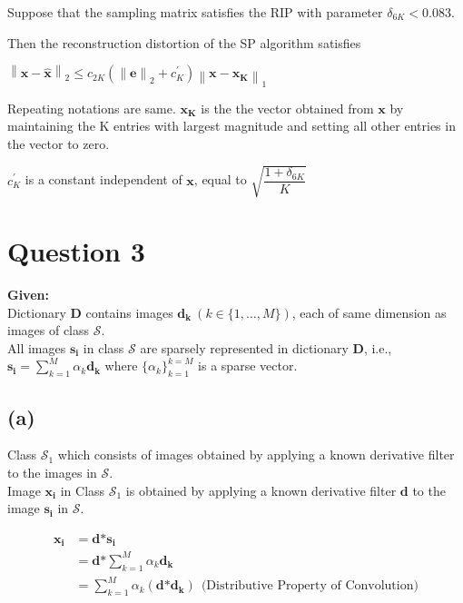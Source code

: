 \documentclass[fleqn, 11pt]{article}
\newcommand{\bs}[1]{\boldsymbol{#1}}
\newcommand\norm[1]{\left\lVert#1\right\rVert}
\begin{document}
\smallskip

Suppose that the sampling matrix satisfies
the RIP with parameter $\delta_{6K} < 0.083 $.  

\smallskip

Then the reconstruction distortion of the SP algorithm satisfies
\begin{center}
    $\norm{\bs{x - \hat{x}}}_2 \leq c_{2K} (\norm{\bs{e}}_2 + c^{'}_{K}  ) \norm{\bs{x - x_K}}_1 $
\end{center}

Repeating notations are same. $\bs{x_K}$ is the the vector obtained from $\bs{x}$ by maintaining the
K entries with largest magnitude and setting all other entries
in the vector to zero.

\smallskip

$c^{'}_{K}$ is a constant independent of $\bs{x}$, equal to $\sqrt{\dfrac{1+\delta_{6K}}{K}}$

\hrulefill

\newpage
\section*{Question 3}
\setcounter{equation}{0}

\textbf{Given:} \\
Dictionary $\bs{D}$ contains images $\bs{d_k} \ (k \in \{1, \dots, M\})$, each of same dimension as images of class $\mathcal{S}$. \\
All images $\bs{s_i}$ in class $\mathcal{S}$ are sparsely represented in dictionary $\bs{D}$, i.e., $\bs{s_i} = \sum_{k=1}^{M} \alpha_k \bs{d_k}$ where $\{\alpha_k\}_{k=1}^{k=M}$ is a sparse vector. \\

\medskip

\subsection*{(a)}
Class $\mathcal{S}_1$ which consists of images obtained by applying a known derivative filter to the images in $\mathcal{S}$. \\
Image $\bs{x_i}$ in Class $\mathcal{S}_1$ is obtained by applying a known derivative filter $\bs{d}$ to the image $\bs{s_i}$ in $\mathcal{S}$.

\begin{equation*}
    \begin{aligned}
        \bs{x_i} &= \bs{d} \bs{*} \bs{s_i} \\
            &= \bs{d} \bs{*} \sum_{k=1}^{M} \alpha_k \bs{d_k} \\
            &= \sum_{k=1}^{M} \alpha_k (\bs{d} \bs{*} \bs{d_k}) \ \ (\text{Distributive Property of Convolution)}\\
    \end{aligned}
\end{equation*}
\end{document}
